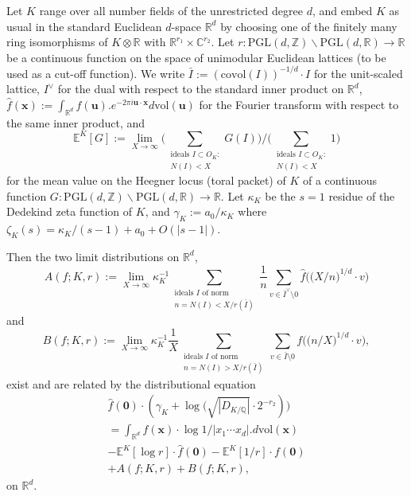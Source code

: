 \documentclass[12pt]{amsart}
\newcommand{\R}{\mathbb{R}}
\newcommand{\C}{\mathbb{C}}
\newcommand{\Z}{\mathbb{Z}}
\newcommand{\Q}{\mathbb{Q}}
\begin{document}
Let $K$ range over all number fields of the unrestricted degree $d$, and embed $K$ as usual in the standard Euclidean $d$-space $\R^d$ by choosing one of the finitely many ring isomorphisms of $K \otimes \R$ with $\R^{r_1} \times \C^{r_2}$. Let $r:  \mathrm{PGL}(d,\Z) \backslash \mathrm{PGL}(d,\R) \to \R$ be a continuous function on the space of unimodular Euclidean lattices (to be used as a cut-off function). We write $\bar{I} := (\mathrm{covol}(I))^{-1/d}\cdot I$ for the unit-scaled lattice, $I^{\vee}$ for the dual with respect to the standard inner product on $\R^d$, $\widehat{f}(\mathbf{x}) := \int_{\mathbb{R}^d} f(\mathbf{u}).e^{-2\pi i \mathbf{u} \cdot \mathbf{x}} d\mathrm{vol}(\mathbf{u})$ for the Fourier transform with respect to the same inner product, and   $$
\mathbb{E}^K[G] := \lim_{X \to \infty} \Big( \sum_{\substack{ \textrm{ideals $I \subset O_K$:} \\ N(I) < X }} G(I) \Big) \Big/ \Big( \sum_{\substack{ \textrm{ideals $I \subset O_K$:} \\ N(I) < X }} 1 \Big)
$$
 for the mean value on the Heegner locus (toral packet) of $K$ of a continuous function $G : \mathrm{PGL}(d,\Z) \backslash \mathrm{PGL}(d,\R) \to \R$. Let $\kappa_K$ be the $s = 1$ residue of the Dedekind zeta function of $K$, and $\gamma_K := a_0 / \kappa_K$ where $\zeta_K(s) = \kappa_K / (s-1) + a_0 + O(|s-1|)$.

Then the two limit distributions on $\R^d$,
$$
A(f;K,r) :=   \lim_{X \to \infty} \kappa_K^{-1} \sum_{\substack{ \textrm{ideals $I$ of norm}\\ n = N(I) < X / r(\bar{I})}} \frac{1}{n}\sum_{ v \in \bar{I}^{\vee} \setminus {0} } \widehat{f}\Big( \big(X/n\big)^{1/d} \cdot v \Big)
$$
and
$$
B(f;K,r) :=   \lim_{X \to \infty} \kappa_K^{-1} \frac{1}{X}\sum_{\substack{ \textrm{ideals $I$ of norm}\\ n = N(I) > X / r(\bar{I})}} \sum_{ v \in \bar{I} \setminus {0} } f\Big( \big(n/X\big)^{1/d} \cdot v \Big),
$$
exist and are related by the distributional equation
\begin{eqnarray*}
\widehat{f}(\mathbf{0}) \cdot (\gamma_K + \log\big(\sqrt{|D_{K/\Q}|} \cdot 2^{-r_2}) \big) \\
= \int_{\R^d} f(\mathbf{x}) \cdot \log 1/|x_1\cdots x_d|.d\mathrm{vol}(\mathbf{x}) \\
- \mathbb{E}^K[ \log{r} ] \cdot \widehat{f}(\mathbf{0}) - \mathbb{E}^K[1/r] \cdot f(\mathbf{0}) \\
 +  A(f;K,r)
  +   B(f;K,r),
\end{eqnarray*}
on $\R^d$.
\end{document}
